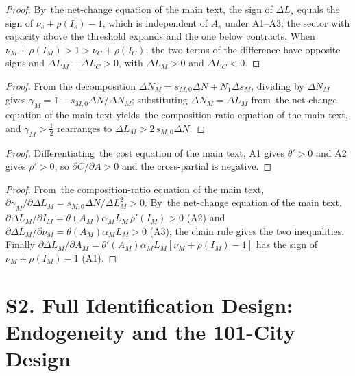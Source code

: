 \documentclass[12pt]{article}
\begin{document}
\begin{proof}
By~the net-change equation of the main text, the sign of $\Delta L_s$ equals the sign of $\nu_s+\rho(I_s)-1$, which is independent of $A_s$ under A1--A3; the sector with capacity above the threshold expands and the one below contracts. When $\nu_M+\rho(I_M)>1>\nu_C+\rho(I_C)$, the two terms of the difference have opposite signs and $\Delta L_M-\Delta L_C>0$, with $\Delta L_M>0$ and $\Delta L_C<0$.
\end{proof}
\begin{proof}
From the decomposition $\Delta N_M=s_{M,0}\Delta N+N_1\Delta s_M$, dividing by $\Delta N_M$ gives $\gamma_M=1-s_{M,0}\Delta N/\Delta N_M$; substituting $\Delta N_M=\Delta L_M$ from~the net-change equation of the main text yields~the composition-ratio equation of the main text, and $\gamma_M>\tfrac12$ rearranges to $\Delta L_M>2\,s_{M,0}\Delta N$.
\end{proof}
\begin{proof}
Differentiating~the cost equation of the main text, A1 gives $\theta'>0$ and A2 gives $\rho'>0$, so $\partial C/\partial A>0$ and the cross-partial is negative.
\end{proof}
\begin{proof}
From~the composition-ratio equation of the main text, $\partial\gamma_M/\partial\Delta L_M=s_{M,0}\Delta N/\Delta L_M^2>0$. By~the net-change equation of the main text, $\partial\Delta L_M/\partial I_M=\theta(A_M)\alpha_M L_M\,\rho'(I_M)>0$ (A2) and $\partial\Delta L_M/\partial\nu_M=\theta(A_M)\alpha_M L_M>0$ (A3); the chain rule gives the two inequalities. Finally $\partial\Delta L_M/\partial A_M=\theta'(A_M)\alpha_M L_M[\nu_M+\rho(I_M)-1]$ has the sign of $\nu_M+\rho(I_M)-1$ (A1).
\end{proof}
\section*{S2. Full Identification Design: Endogeneity and the 101-City Design}
\end{document}
